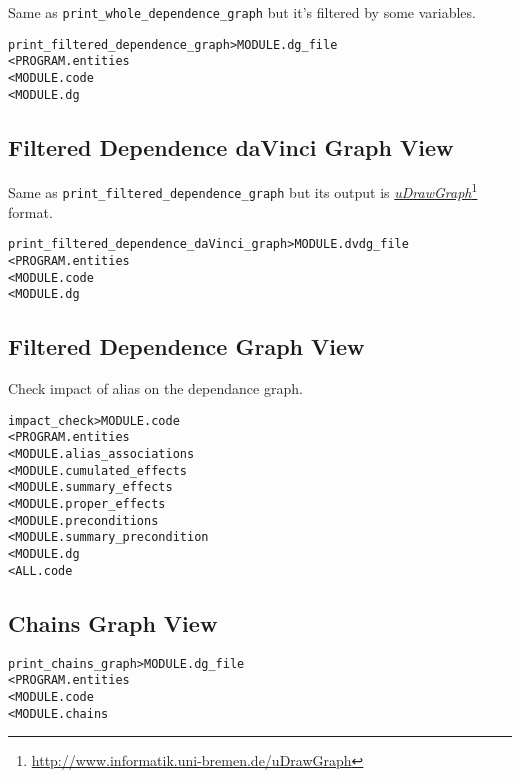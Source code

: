 \documentclass[a4paper]{report}
\newenvironment{PipsMake}{\begin{alltt}}{\end{alltt}}
\newcommand{\LINK}[2]{\href{#2}{#1}\footnote{\url{#2}}\xspace}
\newcommand{\PuDrawGraph}{\LINK{\emph{uDrawGraph}}{http://www.informatik.uni-bremen.de/uDrawGraph}\xspace}
\begin{document}
Same as \texttt{print\_whole\_dependence\_graph} but it's filtered by
some variables.

\begin{PipsMake}
print_filtered_dependence_graph          > MODULE.dg_file
        < PROGRAM.entities
        < MODULE.code
        < MODULE.dg
\end{PipsMake}

\subsection{Filtered Dependence daVinci Graph View}

Same as \texttt{print\_filtered\_dependence\_graph} but its output is
\PuDrawGraph format.

\begin{PipsMake}
print_filtered_dependence_daVinci_graph          > MODULE.dvdg_file
        < PROGRAM.entities
        < MODULE.code
        < MODULE.dg
\end{PipsMake}

\subsection{Filtered Dependence Graph View}

Check impact of alias on the dependance graph.

\begin{PipsMake}
impact_check    > MODULE.code
        < PROGRAM.entities
        < MODULE.alias_associations
        < MODULE.cumulated_effects
        < MODULE.summary_effects
        < MODULE.proper_effects
        < MODULE.preconditions
        < MODULE.summary_precondition
        < MODULE.dg
        < ALL.code
\end{PipsMake}

\subsection{Chains Graph View}

\begin{PipsMake}
print_chains_graph      > MODULE.dg_file
        < PROGRAM.entities
        < MODULE.code
        < MODULE.chains
\end{PipsMake}
\end{document}
